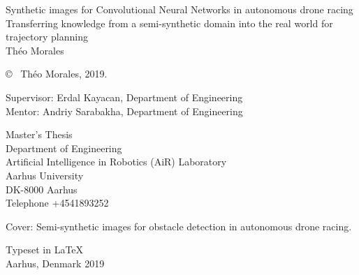 \newpage
\thispagestyle{plain}
\vspace*{4.5cm}
Synthetic images for Convolutional Neural Networks in autonomous
drone racing\\
Transferring knowledge from a semi-synthetic domain into the real world for
trajectory planning\\
Théo Morales \setlength{\parskip}{1cm}

\copyright ~ Théo Morales, 2019. \setlength{\parskip}{1cm}

Supervisor: Erdal Kayacan, Department of Engineering\\
Mentor: Andriy Sarabakha, Department of Engineering\setlength{\parskip}{1cm}

Master's Thesis\\	%
Department of Engineering\\
Artificial Intelligence in Robotics (AiR) Laboratory\\
Aarhus University\\
DK-8000 Aarhus\\
Telephone +4541893252 \setlength{\parskip}{0.5cm}

\vfill
Cover: Semi-synthetic images for obstacle detection in autonomous drone racing. \setlength{\parskip}{0.5cm}

Typeset in \LaTeX \\
Aarhus, Denmark 2019

